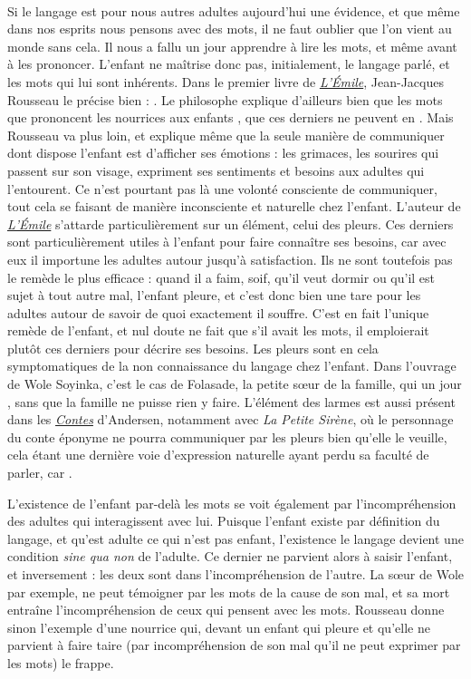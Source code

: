 \documentclass[a4paper,french,bookmarks]{article}
\begin{document}
\text{}\\[20pt]

\qquad Si le langage est pour nous autres adultes aujourd'hui une évidence, et que même dans nos esprits nous pensons avec des mots, il ne faut oublier que l'on vient au monde sans cela. Il nous a fallu un jour apprendre à lire les mots, et même avant à les prononcer. L'enfant ne maîtrise donc pas, initialement, le langage parlé, et les mots qui lui sont inhérents. Dans le premier livre de \underline{\itshape L'Émile}, Jean-Jacques Rousseau le précise bien : . Le philosophe explique d'ailleurs bien que les mots que prononcent les nourrices aux enfants , que ces derniers ne peuvent en . Mais Rousseau va plus loin, et explique même que la seule manière de communiquer dont dispose l'enfant est d'afficher ses émotions : les grimaces, les sourires qui passent sur son visage, expriment ses sentiments et besoins aux adultes qui l'entourent. Ce n'est pourtant pas là une volonté consciente de communiquer, tout cela se faisant de manière inconsciente et naturelle chez l'enfant. L'auteur de \underline{\itshape L'Émile} s'attarde particulièrement sur un élément, celui des pleurs. Ces derniers sont particulièrement utiles à l'enfant pour faire connaître ses besoins, car avec eux il importune les adultes autour jusqu'à satisfaction. Ils ne sont toutefois pas le remède le plus efficace : quand il a faim, soif, qu'il veut dormir ou qu'il est sujet à tout autre mal, l'enfant pleure, et c'est donc bien une tare pour les adultes autour de savoir de quoi exactement il souffre. C'est en fait l'unique remède de l'enfant, et nul doute ne fait que s'il avait les mots, il emploierait plutôt ces derniers pour décrire ses besoins. Les pleurs sont en cela symptomatiques de la non connaissance du langage chez l'enfant. Dans l'ouvrage de Wole Soyinka, c'est le cas de Folasade, la petite sœur de la famille, qui un jour , sans que la famille ne puisse rien y faire. L'élément des larmes est aussi présent dans les \underline{\itshape Contes} d'Andersen, notamment avec \textit{La Petite Sirène}, où le personnage du conte éponyme ne pourra communiquer par les pleurs bien qu'elle le veuille, cela étant une dernière voie d'expression naturelle ayant perdu sa faculté de parler, car .  

\qquad L'existence de l'enfant par-delà les mots se voit également par l'incompréhension des adultes qui interagissent avec lui. Puisque l'enfant existe par définition  du langage, et qu'est adulte ce qui n'est pas enfant, l'existence  le langage devient une condition \textit{sine qua non} de l'adulte. Ce dernier ne parvient alors à saisir l'enfant, et inversement : les deux sont dans l'incompréhension de l'autre. La sœur de Wole par exemple, ne peut témoigner par les mots de la cause de son mal, et sa mort entraîne l'incompréhension de ceux qui pensent avec les mots. Rousseau donne sinon l'exemple d'une nourrice qui, devant un enfant qui pleure et qu'elle ne parvient à faire taire (par incompréhension de son mal qu'il ne peut exprimer par les mots) le frappe.  
\end{document}
